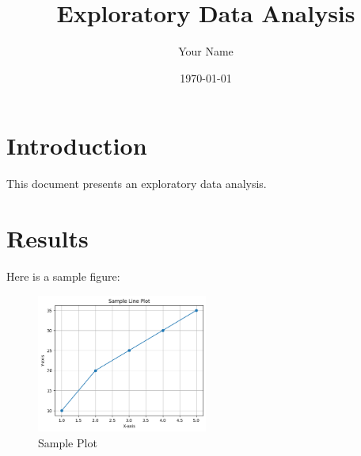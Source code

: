 \documentclass{article}
\title{Exploratory Data Analysis}
\author{Your Name}
\date{\today}
\begin{document}
\maketitle

\section{Introduction}
This document presents an exploratory data analysis.

\section{Results}
Here is a sample figure:

\begin{figure}[h]
    \centering
    \includegraphics[width=0.5\textwidth]{figures/dummy_plot.png}
    \caption{Sample Plot}
    \label{fig:sample_plot}
\end{figure}
\end{document}
